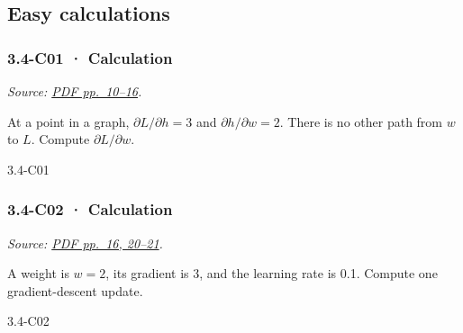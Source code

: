 \subsection{Easy calculations}\label{easy-calculations-10}

\noindent\begin{minipage}{\linewidth}

\subsubsection{3.4-C01 · Calculation}\label{c01-calculation-10}

\emph{Source:
\href{../Lecture\%20Slides/3.4.\%20Deep\%20Learning\%20Fundamentals\%20II.pdf\#page=10}{PDF
pp.~10--16}.}

At a point in a graph, \(\partial L/\partial h=3\) and
\(\partial h/\partial w=2\). There is no other path from \(w\) to \(L\).
Compute \(\partial L/\partial w\).

\begin{solution}[26mm]{3.4-C01}

\end{solution}
\end{minipage}\par\medskip

\noindent\begin{minipage}{\linewidth}

\subsubsection{3.4-C02 · Calculation}\label{c02-calculation-10}

\emph{Source:
\href{../Lecture\%20Slides/3.4.\%20Deep\%20Learning\%20Fundamentals\%20II.pdf\#page=16}{PDF
pp.~16, 20--21}.}

A weight is \(w=2\), its gradient is 3, and the learning rate is 0.1.
Compute one gradient-descent update.

\begin{solution}[26mm]{3.4-C02}

\end{solution}
\end{minipage}\par\medskip

